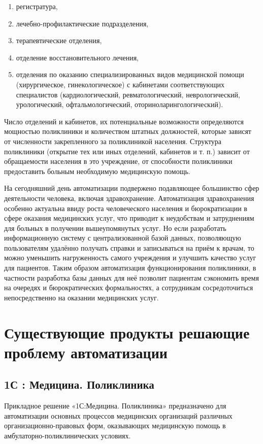 \documentclass[14pt,a4paper,russian]{extreport}
\begin{document}
\begin{enumerate}[noitemsep]
    \item регистратура,
    \item лечебно-профилактические подразделения,
    \item терапевтические отделения,
    \item отделение восстановительного лечения,
    \item отделения по оказанию специализированных видов медицинской помощи (хирургическое,
        гинекологическое) с кабинетами соответствующих специалистов (кардиологический,
        ревматологический, неврологический, урологический, офтальмологический,
        оториноларингологический).
\end{enumerate}

Число отделений и кабинетов, их потенциальные возможности определяются мощностью поликлиники и
количеством штатных должностей, которые зависят от численности закрепленного за
поликлиникой населения. Структура поликлиники (открытие тех или иных отделений, кабинетов и
т. п.) зависит от обращаемости населения в это учреждение, от способности поликлиники предоставить
больным необходимую медицинскую помощь.\cite{medstat}

На сегодняшний день автоматизации подвержено подавляющее большинство сфер деятельности человека,
включая здравохранение. Автоматизация здравохранения особенно актуальна ввиду роста человеческого населения
и бюрократизации в сфере оказания медицинских услуг, что приводит к неудобствам и
затруднениям для больных
в получении вышеупомянутых услуг. Но если разработать информационную систему с
централизованной базой данных, позволяющую пользователям удалённо получать справки и записываться
на приём к
врачам, то можно уменьшить нагруженность самого учреждения и улучшить качество услуг для
пациентов. Таким образом автоматизация функционирования
поликлиники, в частности разработка базы данных для неё позволит пациентам сэкономить время на
очередях и бюрократических формальностях, а сотрудникам сосредоточиться непосредственно на
оказании медицинских услуг.


\section{Существующие продукты решающие проблему автоматизации}

\subsection{1С : Медицина. Поликлиника}
Прикладное решение «1С:Медицина. Поликлиника» предназначено для автоматизации основных процессов
медицинских организаций различных организационно-правовых форм, оказывающих медицинскую помощь в
амбулаторно-поликлинических условиях. 
\end{document}
